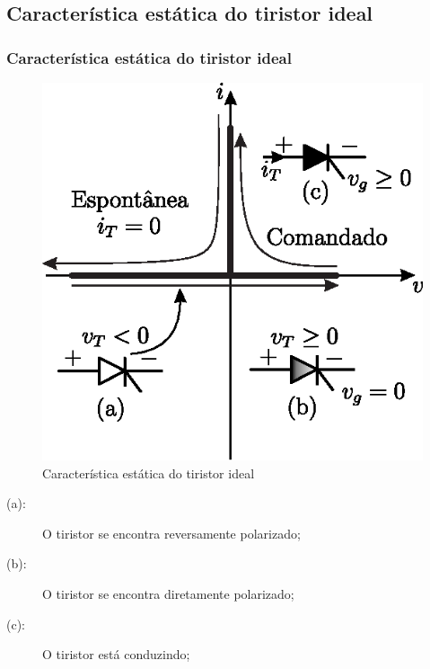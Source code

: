 \documentclass[aspectratio=43]{beamer}
\begin{document}
\subsection{Característica estática do tiristor ideal}
\begin{frame}
	\frametitle{Característica estática do tiristor ideal}
	
	\begin{minipage}{0.45\textwidth}
		\begin{figure}
			\normalsize
			\centering
			\includegraphics[width=0.9\linewidth]{figuras/TiristorCaracteristicaEstatica.eps}
			\caption{Característica estática do tiristor ideal}
			\label{fig:TiristorCaracteristicaEstatica}
		\end{figure}	
	\end{minipage}%
	\begin{minipage}{0.65\textwidth}
		
	\begin{description}
		\item[(a):] O tiristor se encontra reversamente polarizado;
		\item[(b):] O tiristor se encontra diretamente polarizado;
		\item[(c):] O tiristor está conduzindo;
	\end{description}
	\end{minipage}
	
\end{frame}
\end{document}
